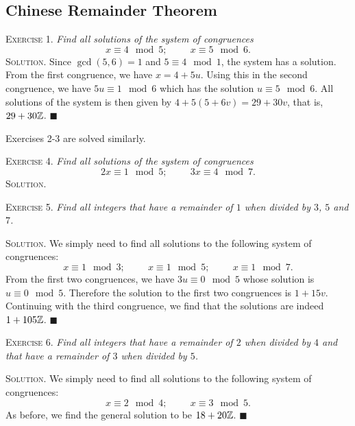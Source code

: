 \documentclass[11pt, leqno]{article}
\newcommand{\done}{\ensuremath{\blacksquare}}
\begin{document}
\subsection{Chinese Remainder Theorem}

\textsc{Exercise 1}. \emph{Find all solutions of the system of congruences 
\begin{displaymath}
x \equiv 4 \mod 5; \hspace{1cm} x\equiv 5 \mod 6.
\end{displaymath}}\textsc{Solution}. Since $\gcd(5,6)=1$ and $5 \equiv 4 \mod 1$, the system has a solution. From the first congruence, we have $x=4+5u$. Using this in the second congruence, we have $5u\equiv 1 \mod 6$ which has the solution $u \equiv 5 \mod 6$. All solutions of the system is then given by $4+5(5+6v) = 29 + 30v$, that is, $29+30\mathbb{Z}$. \done

Exercises 2-3 are solved similarly.

\textsc{Exercise 4}. \emph{Find all solutions of the system of congruences 
\begin{displaymath}
2x \equiv 1 \mod 5; \hspace{1cm} 3x\equiv 4 \mod 7. 
\end{displaymath}}\textsc{Solution}.

\textsc{Exercise 5}. \emph{Find all integers that have a remainder of $1$ when divided by $3$, $5$ and $7$.}

\textsc{Solution}. We simply need to find all solutions to the following system of congruences: 
\begin{displaymath}
x\equiv 1 \mod 3; \hspace{1cm} x\equiv 1 \mod 5; \hspace{1cm} x \equiv 1 \mod 7.
\end{displaymath}
From the first two congruences, we have $3u \equiv 0\mod 5$ whose solution is $u\equiv 0 \mod 5$. Therefore the solution to the first two congruences is $1+15v$. Continuing with the third congruence, we find that the solutions are indeed $1+105\mathbb{Z}$. \done

\textsc{Exercise 6}. \emph{Find all integers that have a remainder of $2$ when divided by $4$ and that have a remainder of $3$ when divided by $5$.}

\textsc{Solution}. We simply need to find all solutions to the following system of congruences: 
\begin{displaymath}
x\equiv 2 \mod 4; \hspace{1cm} x\equiv 3 \mod 5.
\end{displaymath}
As before, we find the general solution to be $18+20\mathbb{Z}$. \done
\end{document}
